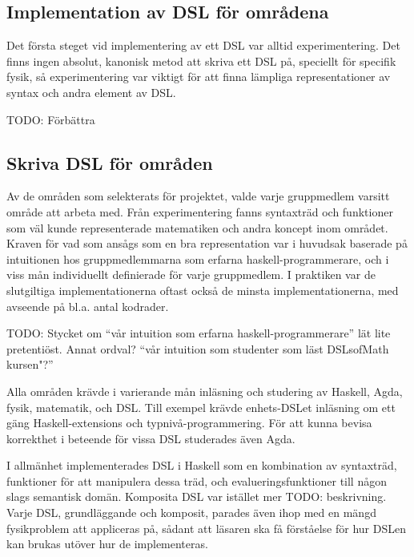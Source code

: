 \begin{binge}
  \section{Implementation av DSL för områdena}

  \begin{draft}
    Det första steget vid implementering av ett DSL var alltid
    experimentering. Det finns ingen absolut, kanonisk metod att skriva
    ett DSL på, speciellt för specifik fysik, så experimentering var
    viktigt för att finna lämpliga representationer av syntax och andra
    element av DSL.
  \end{draft}

  TODO: Förbättra

  \subsection{Skriva DSL för områden}

  \begin{draft}
    Av de områden som selekterats för projektet, valde varje gruppmedlem
    varsitt område att arbeta med. Från experimentering fanns syntaxträd
    och funktioner som väl kunde representerade matematiken och andra
    koncept inom området. Kraven för vad som ansågs som en bra
    representation var i huvudsak baserade på intuitionen hos
    gruppmedlemmarna som erfarna haskell-programmerare, och i viss mån
    individuellt definierade för varje gruppmedlem. I praktiken var de
    slutgiltiga implementationerna oftast också de minsta
    implementationerna, med avseende på bl.a. antal kodrader.

    TODO: Stycket om ``vår intuition som erfarna haskell-programmerare''
    lät lite pretentiöst. Annat ordval? ``vår intuition som studenter
    som läst DSLsofMath kursen"?''

    Alla områden krävde i varierande mån inläsning och studering av
    Haskell, Agda, fysik, matematik, och DSL. Till exempel krävde
    enhets-DSLet inläsning om ett gäng Haskell-extensions och
    typnivå-programmering. För att kunna bevisa korrekthet i beteende
    för vissa DSL studerades även Agda.

    I allmänhet implementerades DSL i Haskell som en kombination av
    syntaxträd, funktioner för att manipulera dessa träd, och
    evalueringsfunktioner till någon slags semantisk domän. Komposita
    DSL var istället mer TODO: beskrivning. Varje DSL, grundläggande och
    komposit, parades även ihop med en mängd fysikproblem att appliceras
    på, sådant att läsaren ska få förståelse för hur DSLen kan brukas
    utöver hur de implementeras.


\end{draft}
\end{binge}
